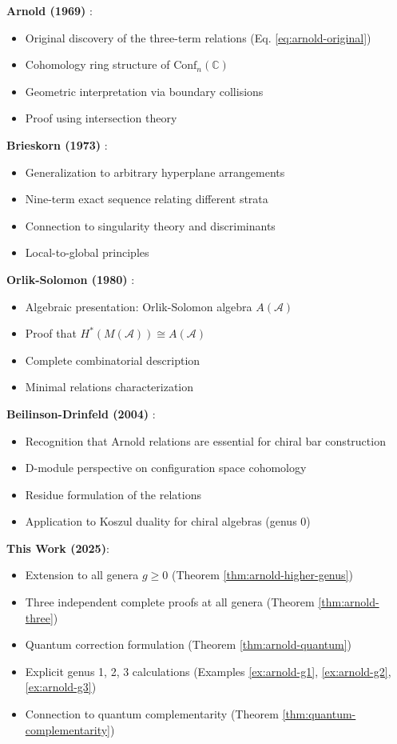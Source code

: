 \begin{attribution}
\textbf{Arnold (1969)} \cite{Arnold69}:
\begin{itemize}
\item Original discovery of the three-term relations (Eq. \ref{eq:arnold-original})
\item Cohomology ring structure of $\text{Conf}_n(\mathbb{C})$
\item Geometric interpretation via boundary collisions
\item Proof using intersection theory
\end{itemize}

\textbf{Brieskorn (1973)} \cite{Brieskorn73}:
\begin{itemize}
\item Generalization to arbitrary hyperplane arrangements
\item Nine-term exact sequence relating different strata
\item Connection to singularity theory and discriminants
\item Local-to-global principles
\end{itemize}

\textbf{Orlik-Solomon (1980)} \cite{OrlikSolomon80}:
\begin{itemize}
\item Algebraic presentation: Orlik-Solomon algebra $A(\mathcal{A})$
\item Proof that $H^*(M(\mathcal{A})) \cong A(\mathcal{A})$
\item Complete combinatorial description
\item Minimal relations characterization
\end{itemize}

\textbf{Beilinson-Drinfeld (2004)} \cite{BD04}:
\begin{itemize}
\item Recognition that Arnold relations are essential for chiral bar construction
\item D-module perspective on configuration space cohomology
\item Residue formulation of the relations
\item Application to Koszul duality for chiral algebras (genus 0)
\end{itemize}

\textbf{This Work (2025)}:
\begin{itemize}
\item Extension to all genera $g \geq 0$ (Theorem \ref{thm:arnold-higher-genus})
\item Three independent complete proofs at all genera (Theorem \ref{thm:arnold-three})
\item Quantum correction formulation (Theorem \ref{thm:arnold-quantum})
\item Explicit genus 1, 2, 3 calculations (Examples \ref{ex:arnold-g1}, \ref{ex:arnold-g2}, \ref{ex:arnold-g3})
\item Connection to quantum complementarity (Theorem \ref{thm:quantum-complementarity})
\end{itemize}
\end{attribution}

